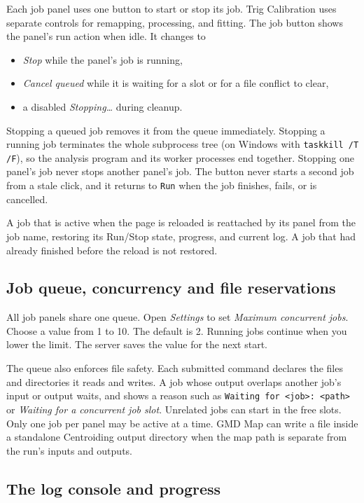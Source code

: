 \documentclass[11pt,a4paper]{article}
\newcommand{\code}[1]{\texttt{#1}}
\begin{document}
Each job panel uses one button to start or stop its job. Trig Calibration
uses separate controls for remapping, processing, and fitting. The job
button shows the panel's run action when idle. It changes to

\begin{itemize}
  \item \emph{Stop} while the panel's job is running,
  \item \emph{Cancel queued} while it is waiting for a slot or for a file
        conflict to clear,
  \item a disabled \emph{Stopping\ldots} during cleanup.
\end{itemize}

Stopping a queued job removes it from the queue immediately. Stopping a
running job terminates the whole subprocess tree (on Windows with
\code{taskkill /\allowbreak{}T /\allowbreak{}F}), so the analysis program and its worker processes
end together. Stopping one panel's job never stops another panel's job.
The button never starts a second job from a stale click, and it returns to
\code{Run} when the job finishes, fails, or is cancelled.

A job that is active when the page is reloaded is reattached by its panel
from the job name, restoring its Run/Stop state, progress, and current log.
A job that had already finished before the reload is not restored.

\subsection{Job queue, concurrency and file reservations}
\label{sec:queue}

All job panels share one queue. Open \emph{Settings} to set
\emph{Maximum concurrent jobs}. Choose a value from 1 to 10. The default is 2.
Running jobs continue when you lower the limit. The server saves the value
for the next start.

The queue also enforces file safety. Each submitted command declares the
files and directories it reads and writes. A job whose output overlaps
another job's input or output waits, and shows a reason such as
\code{Waiting for <job>: <path>} or \emph{Waiting for a concurrent job
slot}. Unrelated jobs can start in the free slots. Only one job per panel
may be active at a time.
GMD Map can write a file inside a standalone Centroiding output directory
when the map path is separate from the run's inputs and outputs.

\subsection{The log console and progress}
\label{sec:log}
\end{document}
